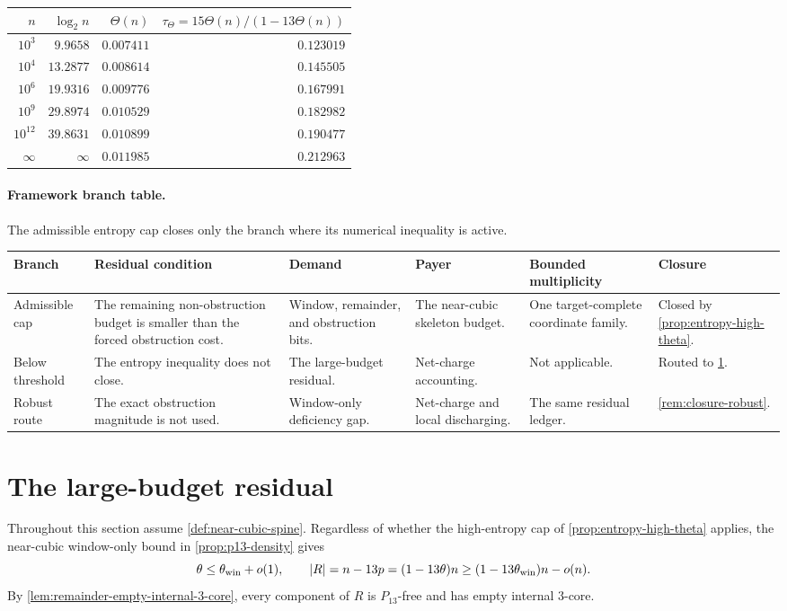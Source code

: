 \documentclass[11pt]{article}
\newcommand{\FrameworkBranchTableHeader}{%
\toprule
\textbf{Branch} & \textbf{Residual condition} & \textbf{Demand} & \textbf{Payer} & \textbf{Bounded multiplicity} & \textbf{Closure}\\
\midrule
}
\begin{document}
\begin{center}
\begin{tabular}{rrrr}
\toprule
$n$ & $\log_2 n$ & $\Theta(n)$ & $\tau_{\Theta}=15\Theta(n)/(1-13\Theta(n))$\\
\midrule
$10^3$ & $9.9658$ & $0.007411$ & $0.123019$\\
$10^4$ & $13.2877$ & $0.008614$ & $0.145505$\\
$10^6$ & $19.9316$ & $0.009776$ & $0.167991$\\
$10^9$ & $29.8974$ & $0.010529$ & $0.182982$\\
$10^{12}$ & $39.8631$ & $0.010899$ & $0.190477$\\
$\infty$ & $\infty$ & $0.011985$ & $0.212963$\\
\bottomrule
\end{tabular}
\end{center}

\paragraph{Framework branch table.}
The admissible entropy cap closes only the branch where its numerical
inequality is active.
\begin{longtable}{L{0.13\textwidth} L{0.19\textwidth} L{0.14\textwidth} L{0.14\textwidth} L{0.17\textwidth} L{0.17\textwidth}}
\FrameworkBranchTableHeader
Admissible cap
&
The remaining non-obstruction budget is smaller than the forced obstruction cost.
&
Window, remainder, and obstruction bits.
&
The near-cubic skeleton budget.
&
One target-complete coordinate family.
&
Closed by \cref{prop:entropy-high-theta}.
\\
\addlinespace
Below threshold
&
The entropy inequality does not close.
&
The large-budget residual.
&
Net-charge accounting.
&
Not applicable.
&
Routed to \cref{sec:large-budget}.
\\
\addlinespace
Robust route
&
The exact obstruction magnitude is not used.
&
Window-only deficiency gap.
&
Net-charge and local discharging.
&
The same residual ledger.
&
\cref{rem:closure-robust}.
\\
\bottomrule
\end{longtable}

\section{The large-budget residual}\label{sec:large-budget}

Throughout this section assume \cref{def:near-cubic-spine}.
Regardless of whether the high-entropy cap of
\cref{prop:entropy-high-theta} applies, the near-cubic window-only bound in
\cref{prop:p13-density} gives
\[
\theta\le\theta_{\rm win}+o(1),
\qquad
|R|=n-13p=(1-13\theta)n\ge(1-13\theta_{\rm win})n-o(n).
\]
By \cref{lem:remainder-empty-internal-3-core}, every component of \(R\) is
\(P_{13}\)-free and has empty internal \(3\)-core.
\end{document}

